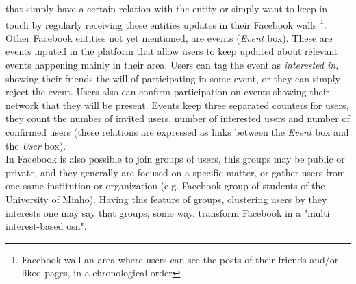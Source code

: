 that simply have a certain relation with the entity or simply want to keep in touch by regularly receiving these entities updates in their Facebook walls
\footnote{Facebook wall an area where users can see the posts of their friends and/or liked pages, in a chronological order}.\\
\indent Other Facebook entities not yet mentioned, are events (\textit{Event} box). These are events inputed in the platform that allow
users to keep updated about relevant events happening mainly in their area. Users can tag the event as \textit{interested in}, showing their friends
the will of participating in some event, or they can simply reject the event. Users also can confirm participation on events
showing their network that they will be present. Events keep three separated counters for users, they count the number of invited users, number of
interested users and number of confirmed users (these relations are expressed as links between the \textit{Event} box and the \textit{User} box).\\
\indent In Facebook is also possible to join groups of users, this groups may be public or private, and they generally are focused on a specific matter,
or gather users from one same institution or organization (e.g. Facebook group of students of the University of Minho).
Having this feature of groups, clustering users by they interests one may say that groups, some way, transform Facebook in a "multi interest-based \gls{osn}".

